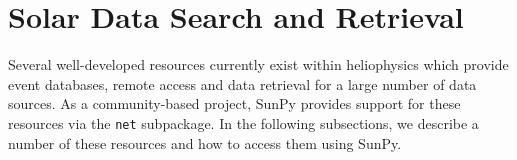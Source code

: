 \section{Solar Data Search and Retrieval}\label{sec:retrieval}

Several well-developed resources currently exist within heliophysics which provide event databases, 
remote access and data retrieval for a large number of data sources. As a community-based project, 
SunPy provides support for these resources via the \texttt{net} subpackage. 
In the following subsections, we describe a number of these resources and 
how to access them using SunPy.






